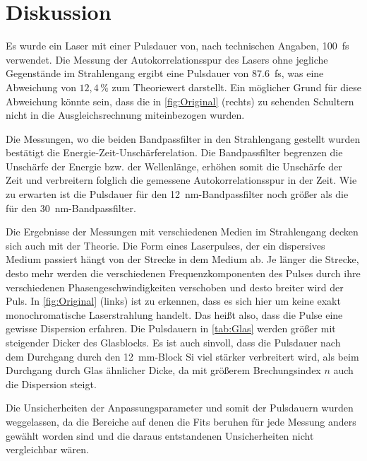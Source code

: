 \newpage
\section{Diskussion}
\label{sec:disskussion}

Es wurde ein Laser mit einer Pulsdauer von, nach technischen Angaben, \qty{100}{fs} verwendet.
Die Messung der Autokorrelationsspur des Lasers ohne jegliche Gegenstände im Strahlengang ergibt eine Pulsdauer von \qty{87,6}{fs}, was eine Abweichung von $12,4\,\%$ zum Theoriewert darstellt.
Ein möglicher Grund für diese Abweichung könnte sein, dass die in \autoref{fig:Original} (rechts) zu sehenden Schultern nicht in die Ausgleichsrechnung miteinbezogen wurden.

Die Messungen, wo die beiden Bandpassfilter in den Strahlengang gestellt wurden bestätigt die Energie-Zeit-Unschärferelation.
Die Bandpassfilter begrenzen die Unschärfe der Energie bzw. der Wellenlänge, erhöhen somit die Unschärfe der Zeit und verbreitern folglich die gemessene Autokorrelationsspur in der Zeit.
Wie zu erwarten ist die Pulsdauer für den \qty{12}{nm}-Bandpassfilter noch größer als die für den \qty{30}{nm}-Bandpassfilter.

Die Ergebnisse der Messungen mit verschiedenen Medien im Strahlengang decken sich auch mit der Theorie.
Die Form eines Laserpulses, der ein dispersives Medium passiert hängt von der Strecke in dem Medium ab.
Je länger die Strecke, desto mehr werden die verschiedenen Frequenzkomponenten des Pulses durch ihre verschiedenen Phasengeschwindigkeiten verschoben und desto breiter wird der Puls.
In \autoref{fig:Original} (links) ist zu erkennen, dass es sich hier um keine exakt monochromatische Laserstrahlung handelt.
Das heißt also, dass die Pulse eine gewisse Dispersion erfahren.
Die Pulsdauern in \autoref{tab:Glas} werden größer mit steigender Dicker des Glasblocks.
Es ist auch sinvoll, dass die Pulsdauer nach dem Durchgang durch den \qty{12}{mm}-Block Si viel stärker verbreitert wird, als beim Durchgang durch Glas ähnlicher Dicke, da mit größerem Brechungsindex $n$ auch die Dispersion steigt.

Die Unsicherheiten der Anpassungsparameter und somit der Pulsdauern wurden weggelassen, da die Bereiche auf denen die Fits beruhen für jede Messung anders gewählt worden sind und die daraus entstandenen Unsicherheiten nicht vergleichbar wären.


